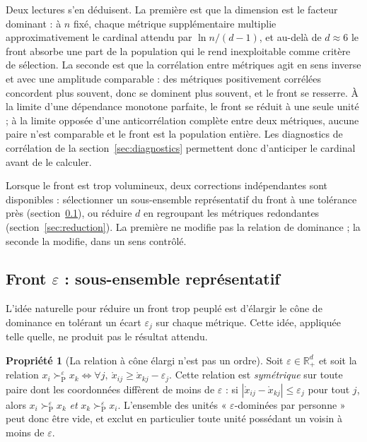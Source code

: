 \documentclass[11pt,a4paper]{article}
\theoremstyle{definition}
\newtheorem{propriete}{Propriété}[section]
\theoremstyle{remark}
\newcommand{\R}{\mathbb{R}}
\newcommand{\abs}[1]{\left\lvert #1 \right\rvert}
\newcommand{\pareto}{\succ_{\mathrm{P}}}
\begin{document}
\bigskip

Deux lectures s'en déduisent. La première est que la dimension est le facteur dominant :
à $n$ fixé, chaque métrique supplémentaire multiplie approximativement le cardinal
attendu par $\ln n / (d-1)$, et au-delà de $d \approx 6$ le front absorbe une part de la
population qui le rend inexploitable comme critère de sélection. La seconde est que la
corrélation entre métriques agit en sens inverse et avec une amplitude comparable :
des métriques positivement corrélées concordent plus souvent, donc se dominent plus
souvent, et le front se resserre. À la limite d'une dépendance monotone parfaite, le
front se réduit à une seule unité ; à la limite opposée d'une anticorrélation complète
entre deux métriques, aucune paire n'est comparable et le front est la population
entière. Les diagnostics de corrélation de la section~\ref{sec:diagnostics} permettent
donc d'anticiper le cardinal avant de le calculer.

\bigskip

Lorsque le front est trop volumineux, deux corrections indépendantes sont disponibles :
sélectionner un sous-ensemble représentatif du front à une tolérance près
(section~\ref{sec:front-epsilon}), ou réduire $d$ en regroupant les métriques redondantes
(section~\ref{sec:reduction}). La première ne modifie pas la relation de dominance ; la
seconde la modifie, dans un sens contrôlé.

\bigskip

\subsection{Front \texorpdfstring{$\varepsilon$}{epsilon} : sous-ensemble représentatif}
\label{sec:front-epsilon}

\medskip

L'idée naturelle pour réduire un front trop peuplé est d'élargir le cône de dominance en
tolérant un écart $\varepsilon_j$ sur chaque métrique. Cette idée, appliquée telle quelle,
ne produit pas le résultat attendu.

\medskip

\begin{propriete}[La relation à cône élargi n'est pas un ordre]
  \label{prop:eps-symetrique}
  Soit $\varepsilon \in \R_+^d$ et soit la relation
  $x_i \pareto^{\varepsilon} x_k \iff \forall j,\ \mathring{x}_{ij} \ge
  \mathring{x}_{kj} - \varepsilon_j$. Cette relation est \emph{symétrique} sur toute
  paire dont les coordonnées diffèrent de moins de $\varepsilon$ : si
  $\abs{\mathring{x}_{ij} - \mathring{x}_{kj}} \le \varepsilon_j$ pour tout $j$, alors
  $x_i \pareto^{\varepsilon} x_k$ \emph{et} $x_k \pareto^{\varepsilon} x_i$. L'ensemble
  des unités « $\varepsilon$-dominées par personne » peut donc être vide, et exclut en
  particulier toute unité possédant un voisin à moins de $\varepsilon$.
\end{propriete}
\end{document}
